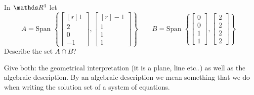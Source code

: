 \begin{problem}{\problemnum}
In $\bbR^4$ let
\[
A = \text{Span }\left\{\begin{bmatrix}[r]1\\2\\0\\-1\end{bmatrix}, \begin{bmatrix}[r]-1\\1\\1\\1\end{bmatrix}\right\} \qquad B = \text{Span }\left\{\begin{bmatrix}0\\0\\1\\1\end{bmatrix}, \begin{bmatrix}2\\2\\2\\2\end{bmatrix}\right\}
\]
Describe the set $A \cap B$?

Give both: the geometrical interpretation (it is a plane, line etc..) as well as the algebraic description. By an algebraic description we mean something that we do when writing the solution set of a system of equations.
\end{problem}
